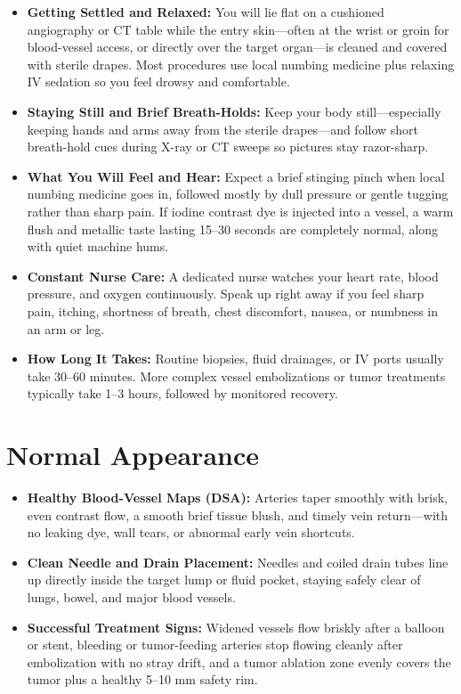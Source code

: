 \begin{itemize}
    \item \textbf{Getting Settled and Relaxed:} You will lie flat on a cushioned angiography or CT table while the entry skin---often at the wrist or groin for blood-vessel access, or directly over the target organ---is cleaned and covered with sterile drapes. Most procedures use local numbing medicine plus relaxing IV sedation so you feel drowsy and comfortable.
    \item \textbf{Staying Still and Brief Breath-Holds:} Keep your body still---especially keeping hands and arms away from the sterile drapes---and follow short breath-hold cues during X-ray or CT sweeps so pictures stay razor-sharp.
    \item \textbf{What You Will Feel and Hear:} Expect a brief stinging pinch when local numbing medicine goes in, followed mostly by dull pressure or gentle tugging rather than sharp pain. If iodine contrast dye is injected into a vessel, a warm flush and metallic taste lasting 15--30 seconds are completely normal, along with quiet machine hums.
    \item \textbf{Constant Nurse Care:} A dedicated nurse watches your heart rate, blood pressure, and oxygen continuously. Speak up right away if you feel sharp pain, itching, shortness of breath, chest discomfort, nausea, or numbness in an arm or leg.
    \item \textbf{How Long It Takes:} Routine biopsies, fluid drainages, or IV ports usually take 30--60 minutes. More complex vessel embolizations or tumor treatments typically take 1--3 hours, followed by monitored recovery.
\end{itemize}

\section{Normal Appearance}

\begin{itemize}
    \item \textbf{Healthy Blood-Vessel Maps (DSA):} Arteries taper smoothly with brisk, even contrast flow, a smooth brief tissue blush, and timely vein return---with no leaking dye, wall tears, or abnormal early vein shortcuts.
    \item \textbf{Clean Needle and Drain Placement:} Needles and coiled drain tubes line up directly inside the target lump or fluid pocket, staying safely clear of lungs, bowel, and major blood vessels.
    \item \textbf{Successful Treatment Signs:} Widened vessels flow briskly after a balloon or stent, bleeding or tumor-feeding arteries stop flowing cleanly after embolization with no stray drift, and a tumor ablation zone evenly covers the tumor plus a healthy 5--10 mm safety rim.
\end{itemize}

